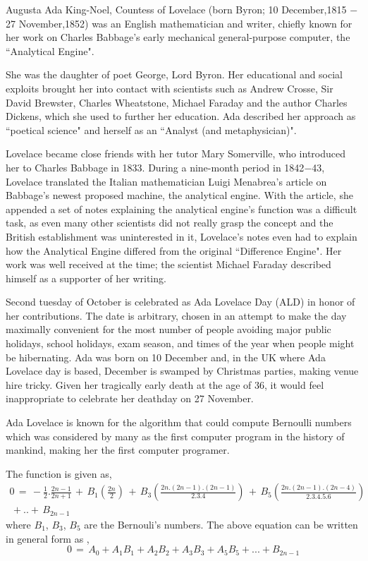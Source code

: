 \documentclass[fleqn,letterpaper,12pt]{report}
\begin{document}
\assignmenttitle

%
{}
\problem
Augusta Ada King-Noel, Countess of Lovelace (born Byron; 10 December,1815 $-$ 27 November,1852) was an English mathematician and writer, chiefly known for her work on Charles Babbage's early mechanical general-purpose computer, the ``Analytical Engine".

She was the daughter of poet George, Lord Byron. Her educational and social exploits brought her into contact with scientists such as Andrew Crosse, Sir David Brewster, Charles Wheatstone, Michael Faraday and the author Charles Dickens, which she used to further her education. Ada described her approach as ``poetical science" and herself as an ``Analyst (and metaphysician)".

Lovelace became close friends with her tutor Mary Somerville, who introduced her to Charles Babbage in 1833. During a nine-month period in 1842$-$43, Lovelace translated the Italian mathematician Luigi Menabrea's article on Babbage's newest proposed machine, the analytical engine. With the article, she appended a set of notes explaining the analytical engine's function was a difficult task, as even many other scientists did not really grasp the concept and the British establishment was uninterested in it, Lovelace's notes even had to explain how the Analytical Engine differed from the original ``Difference Engine". Her work was well received at the time; the scientist Michael Faraday described himself as a supporter of her writing.

Second tuesday of October is celebrated as Ada Lovelace Day (ALD) in honor of her contributions. The date is arbitrary, chosen in an attempt to make the day maximally convenient for the most number of people avoiding major public holidays, school holidays, exam season, and times of the year when people might be hibernating. Ada was born on 10 December and, in the UK where Ada Lovelace day is based, December is swamped by Christmas parties, making venue hire tricky. Given her tragically early death at the age of 36, it would feel inappropriate to celebrate her deathday on 27 November.\cite{ll}

Ada Lovelace is known for the algorithm that could compute Bernoulli numbers which was considered by many as the first computer program in the history of mankind, making her the first computer programer.

The function is given as,
\begin{equation}
\begin{split}	
	0\,=\, -\frac{1}{2}.\frac{2n-1}{2n+1}\,+\,B_1\left(\frac{2n}{2}\right)\,+\,B_3\left(\frac{2n.(2n-1).(2n-1)}{2.3.4}\right)\,+\,B_5\left(\frac{2n.(2n-1).(2n-4)}{2.3.4.5.6}\right)\\
	\,+..+\,B_{2n-1}
	\end{split}
\end{equation}
where $B_1$, $B_3$, $B_5$ are the Bernouli's numbers. 
The above equation can be written in general form as ,
\begin{equation}
	0\,=\,A_0+ A_1B_1 + A_2B_2 + A_3B_3 + A_5B_5 
	+...+ B_{2n-1}
\end{equation}
\end{document}
